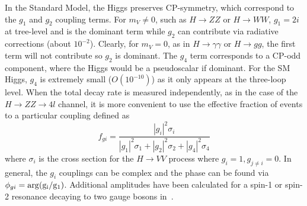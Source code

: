 In the Standard Model, the Higgs preserves CP-symmetry, which correspond to the $g_1$ and $g_2$ coupling terms. For $m_V \neq 0$, such as $H\rightarrow ZZ$ or $H\rightarrow WW$, $g_1=2i$ at tree-level and is the dominant term while $g_2$ can contribute via radiative corrections (about $10^{-2}$). Clearly, for $m_V=0$, as in $H\rightarrow\gamma\gamma$ or $H\rightarrow gg$, the first term will not contribute so $g_2$ is dominant. The $g_4$ term corresponds to a CP-odd component, where the Higgs would be a pseudoscalar if dominant. For the SM Higgs, $g_4$ is extremely small ($O(10^{-10})$) \cite{Soni:1993} as it only appears at the three-loop level. When the total decay rate is measured independently, as in the case of the $H\rightarrow ZZ \rightarrow 4l$ channel, it is more convenient to use the effective fraction of events to a particular coupling defined as
\begin{equation}
f_{gi} = \frac{|g_i|^2\sigma_i}{|g_1|^2\sigma_1 + |g_2|^2\sigma_2 + |g_4|^2\sigma_4}
\label{eqn:fgi_eqn}
\end{equation}
where $\sigma_i$ is the cross section for the $H\rightarrow VV$ process where $g_i=1,g_{j\neq i}=0$. In general, the $g_i$ couplings can be complex and the phase can be found via $\phi_{gi}=\rm{arg}{(g_i/g_1)}$. Additional amplitudes have been calculated for a spin-1 or spin-2 resonance decaying to two gauge bosons in~\cite{Gao:2010qx}.

